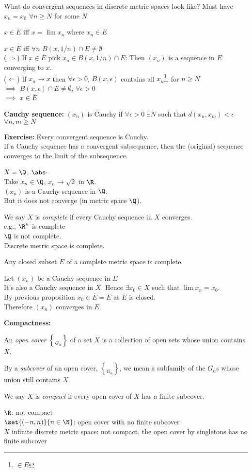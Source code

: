 
\ex What do convergent sequences in discrete metric spaces look like?  Must have $x_n=x_0$ $\forall n\geq N$ for some $N$

\prop $x\in\overline{E}$ iff $x=\lim x_n$ where $x_n\in E$

\pf $x\in\overline{E}$ iff $\forall n$ $B(x,1/n)\cap E\neq\emptyset$ \\
($\Longrightarrow$) If $x\in\overline{E}$ pick $x_n\in B(x,1/n)\cap E$: Then $(x_n)$ is a sequence in $E$ converging to $x$. \\
($\Longleftarrow$) If $x_n\to x$ then $\forall\epsilon>0$, $B(x,\epsilon)$ contains all $x_n$\footnote{$\in E$}, for $n\geq N$ \\
$\implies$ $B(x,\epsilon)\cap E\neq\emptyset$, $\forall\epsilon>0$ \\
$\implies$ $x\in\overline{E}$

\textbf{Cauchy sequence:} $(x_n)$ is Cauchy if $\forall\epsilon>0$ $\exists N$ such that $d(x_n,x_m)<\epsilon$ $\forall n,m\geq N$

\textbf{Exercise:} Every convergent sequence is Cauchy. \\
If a Cauchy sequence has a convergent subsequence, then the (original) sequence converges to the limit of the subsequence.

\ex $X=\Q$, $\abs\cdot$ \\ %
Take $x_n\in\Q$, $x_n\to\sqrt2$ in $\R$. \\
$(x_n)$ is a Cauchy sequence in $\Q$. \\
But it does not converge (in metric space $\Q$).

 We say $X$ is \emph{complete} if every Cauchy sequence in $X$ converges. \\
e.g., $\R^n$ is complete \\
$\Q$ is not complete. \\
Discrete metric space is complete.

\prop Any closed subset $E$ of a complete metric space is complete.

\pf Let $(x_n)$ be a Cauchy sequence in $E$ \\
It's also a Cauchy sequence in $X$.  Hence $\exists x_0\in X$ such that $\lim x_n=x_0$. \\
By previous proposition $x_0\in\overline E=E$ as $E$ is closed. \\
Therefore $(x_n)$ converges in $E$.

\textbf{Compactness:}

 An \emph{open cover} $\brace{G_\alpha}$ of a set $X$ is a collection of open sets whose union contains $X$.

By a \emph{subcover} of an open cover, $\brace{G_\alpha}$, we mean a subfamily of the $G_\alpha$s whose union still contains $X$.

 We say $X$ is \emph{compact} if every open cover of $X$ has a finite subcover.

\ex $\R$: not compact \\
$\set{(-n,n)}{n\in\N}$: open cover with no finite subcover \\
$X$ infinite discrete metric space: not compact, the open cover by singletons has no finite subcover
